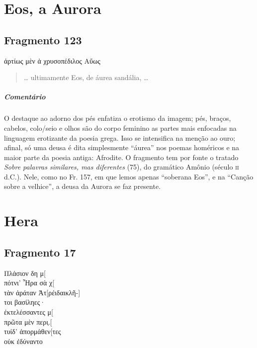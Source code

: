 {\chapter{Eos, a Aurora}

\section{Fragmento 123}

\begin{gkverse}
ἀρτίως μὲν ἀ χρυσοπέδιλος Αὔως
\end{gkverse}

\begin{verse}
\ldots{} ultimamente Eos, de áurea sandália, \ldots{}
\end{verse}

{\paragraph{Comentário} O destaque ao adorno dos pés enfatiza o erotismo da imagem; pés, braços,
cabelos, colo/seio e olhos são do corpo feminino as partes mais enfocadas na
linguagem erotizante da poesia grega. Isso se intensifica na menção ao ouro;
afinal, só uma deusa é dita simplesmente ``áurea” nos poemas homéricos
e na maior parte da poesia antiga: Afrodite. O fragmento tem por fonte o
tratado \textit{Sobre palavras similares, mas diferentes} (75), do gramático Amônio
(século \textsc{ii} d.C.).
Nele, como no Fr. 157, em que lemos apenas ``soberana Eos'', e na ``Canção sobre a velhice'', a deusa da Aurora se faz presente.}



\chapter{Hera}

\section{Fragmento 17}

\begin{gkverse}
Πλάσιον δη μ[\\
πότνι’ Ἦρα σὰ χ[\\
τὰν ἀράταν Ἀτ[ρέιδαι\qquad        κλῆ-]\\
τοι βασίληες·\\

ἐκτελέσσαντες μ[\\
πρῶτα μὲν περι̣.[\\
τυίδ’ ἀπορμάθεν[τες\\
οὐκ ἐδύναντο


\end{gkverse}}
